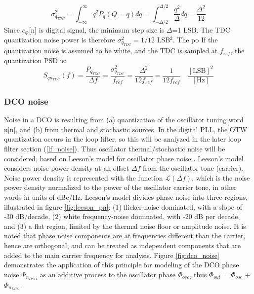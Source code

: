 	\begin{equation}\label{eq:tdc_noise}
		\sigma_{q_{TDC}}^2 = \int_{-\infty}^\infty q^2P_q(Q=q)dq =  \int_{-\Delta/2}^{\Delta/2}\frac{q^2}{\Delta}dq = \frac{\Delta^2}{12}
	\end{equation}
	Since $e_\Phi$[n] is digital signal, the minimum step size is $\Delta$=1 LSB. The TDC quantization noise power is therefore $\sigma_{q_{TDC}}^2 = 1/12$ LSB$^2$. The po
	If the quantization noise is assumed to be white, and the TDC is sampled at $f_{ref}$, the quantization PSD is:
	\begin{equation}
		S_{qn_{TDC}}(f) = \frac{P_{q_{TDC}}}{\Delta f} = \frac{\sigma_{q_{TDC}}^2}{f_{ref}} = \frac{\Delta^2}{12f_{ref}} = \frac{1}{12f_{ref}} \hspace{1em}\frac{[\text{LSB}]^2}{[\text{Hz}]}
	\end{equation}

\subsubsection{DCO noise}\label{dco_noise}
	Noise in a DCO is resulting from (a) quantization of the oscillator tuning word u[n], and (b) from thermal and stochastic sources. In the digital PLL, the OTW quantization occurs in the loop filter, so this will be analyzed in the later loop filter section (\ref{lf_noise}). Thus oscillator thermal/stochastic noise will be considered, based on Leeson's model for oscillator phase noise \cite{leeson_1966}. Leeson's model considers noise power density at an offset $\Delta f$ from the oscillator tone (carrier). Noise power density is represented with the function $\mathcal{L}(\Delta f)$, which is the noise power density normalized to the power of the oscillator carrier tone, in other words in units of dBc/Hz. Leeson's model divides phase noise into three regions, illustrated in figure \ref{fig:leeson_pn}: (1) flicker-noise dominated, with a slope of -30 dB/decade, (2) white frequency-noise dominated, with -20 dB per decade, and (3) a flat region, limited by the thermal noise floor or amplitude noise. It is noted that phase noise components are at frequencies different than the carrier, hence are orthogonal, and can be treated as independent components that are added to the main carrier frequency for analysis. Figure \ref{fig:dco_noise} demonstrates the application of this principle for modeling of the DCO phase noise $\Phi_{n_{DCO}}$ as an additive process to the oscillator phase $\Phi_{osc}$, thus $\Phi_{out}$ = $\Phi_{osc}$ + $\Phi_{n_{DCO}}$.


